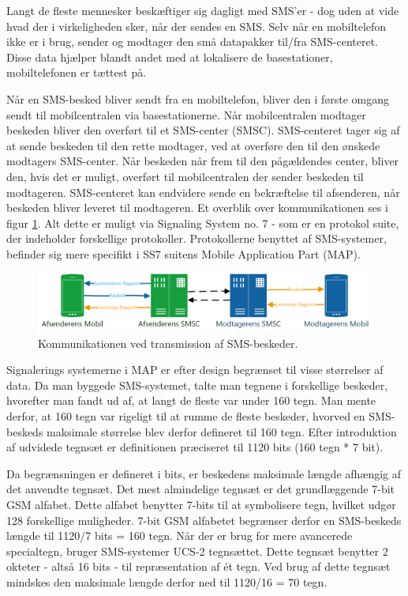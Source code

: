 Langt de fleste mennesker beskæftiger sig dagligt med SMS'er - dog uden at vide hvad der i virkeligheden sker, når der sendes en SMS. Selv når en mobiltelefon ikke er i brug, sender og modtager den små datapakker til/fra SMS-centeret. Disse data hjælper blandt andet med at lokalisere de basestationer, mobiltelefonen er tættest på.

Når en SMS-besked bliver sendt fra en mobiltelefon, bliver den i første omgang sendt til mobilcentralen via basestationerne. Når mobilcentralen modtager beskeden bliver den overført til et SMS-center (SMSC). SMS-centeret tager sig af at sende beskeden til den rette modtager, ved at overføre den til den ønskede modtagers SMS-center. Når beskeden når frem til den pågældendes center, bliver den, hvis det er muligt, overført til mobilcentralen der sender beskeden til modtageren. SMS-centeret kan endvidere sende en bekræftelse til afsenderen, når beskeden bliver leveret til modtageren. Et overblik over kommunikationen ses i figur \ref{smsTransm}. Alt dette er muligt via Signaling System no. 7 - som er en protokol suite, der indeholder forskellige protokoller. Protokollerne benyttet af SMS-systemer, befinder sig mere specifikt i SS7 suitens Mobile Application Part (MAP). \cite{Pro_1} \cite{sms_max1}

\noindent
\begin{figure}[hba]
\includegraphics[width=\linewidth]{Billeder/Mobil.png}
\caption {Kommunikationen ved transmission af SMS-beskeder.}
\label{smsTransm}
\end{figure}

Signalerings systemerne i MAP er efter design begrænset til visse størrelser af data. Da man byggede SMS-systemet, talte man tegnene i forskellige beskeder, hvorefter man fandt ud af, at langt de fleste var under 160 tegn. Man mente derfor, at 160 tegn var rigeligt til at rumme de fleste beskeder, hvorved en SMS-beskeds maksimale størrelse blev derfor defineret til 160 tegn. Efter introduktion af udvidede tegnsæt er definitionen præciseret til 1120 bits (160 tegn * 7 bit). \cite{sms_max1} \cite{sms_max2}


Da begrænsningen er defineret i bits, er beskedens maksimale længde afhængig af det anvendte tegnsæt. Det mest almindelige tegnsæt er det grundlæggende 7-bit GSM alfabet. Dette alfabet benytter 7-bits til at symbolisere tegn, hvilket udgør 128 forskellige muligheder. 7-bit GSM alfabetet begrænser derfor en SMS-beskeds længde til 1120/7 bits = 160 tegn. Når der er brug for mere avancerede specialtegn, bruger SMS-systemer UCS-2 tegnsættet. Dette tegnsæt benytter 2 okteter - altså 16 bits - til repræsentation af ét tegn. Ved brug af dette tegnsæt mindskes den maksimale længde derfor ned til 1120/16 = 70 tegn. \cite{sms_pdu}

